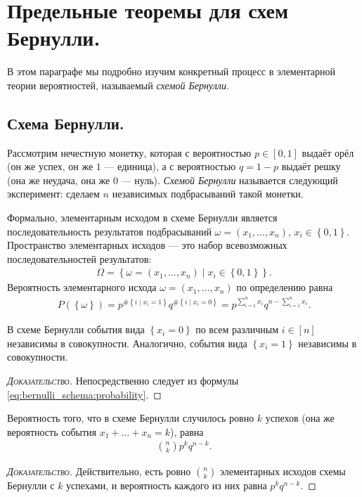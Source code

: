 \documentclass[../main.tex]{subfiles}
\begin{document}
\newpage
\section{Предельные теоремы для схем Бернулли.}

В этом параграфе мы подробно изучим конкретный процесс в элементарной теории вероятностей, называемый \textit{схемой Бернулли}.

\subsection{Схема Бернулли.}

\begin{df}
 Рассмотрим нечестную монетку, которая с вероятностью $p \in [0,1]$ выдаёт орёл (он же успех, он же $1$ --- единица), а с вероятностью $q = 1 - p$ выдаёт решку (она же неудача, она же $0$ --- нуль). \textit{Схемой Бернулли} называется следующий эксперимент: сделаем $ n $ независимых подбрасываний такой монетки.

 Формально, элементарным исходом в схеме Бернулли является последовательность результатов подбрасываний $\omega = (x_1, \ldots, x_n)$, $x_i \in \left\{ 0,1 \right\}$. Пространство элементарных исходов --- это набор всевозможных последовательностей результатов:
 \begin{align*}
  \Omega = \left\{ \omega = (x_1, \ldots, x_n) \mid x_i \in \left\{ 0,1 \right\} \right\}.
 \end{align*} Вероятность элементарного исхода $\omega = (x_1, \ldots, x_n)$ по определению равна
 \begin{align}
  \label{eq:bernulli_schema:probability}
  P(\left\{ \omega \right\}) = p^{\# \left\{ i \mid x_i = 1 \right\}} q^{\# \left\{ i \mid x_i = 0 \right\}} = p^{\sum_{i=1}^{n} x_i} q^{n - \sum_{i=1}^{n} x_i}
 .\end{align} 
\end{df}

\begin{prop}
 В схеме Бернулли события вида $\left\{ x_i = 0 \right\}$ по всем различным $i \in [n]$ независимы в совокупности. Аналогично, события вида $\left\{ x_i = 1 \right\}$  независимы в совокупности.
\end{prop}
\begin{proof}[\normalfont\textsc{Доказательство}]
 Непосредственно следует из формулы \eqref{eq:bernulli_schema:probability}.
\end{proof}

\begin{prop}
 Вероятность того, что в схеме Бернулли случилось ровно $k$ успехов (она же вероятность события $x_1 + \ldots + x_n = k$), равна
 \begin{align*}
  \binom n k p^{k} q^{n-k}
 .\end{align*} 
\end{prop}
\begin{proof}[\normalfont\textsc{Доказательство}]
 Действительно, есть ровно $ \binom n k $ элементарных исходов схемы Бернулли с $ k $ успехами, и вероятность каждого из них равна $ p^{k}q^{n-k} $.
\end{proof}
\end{document}
